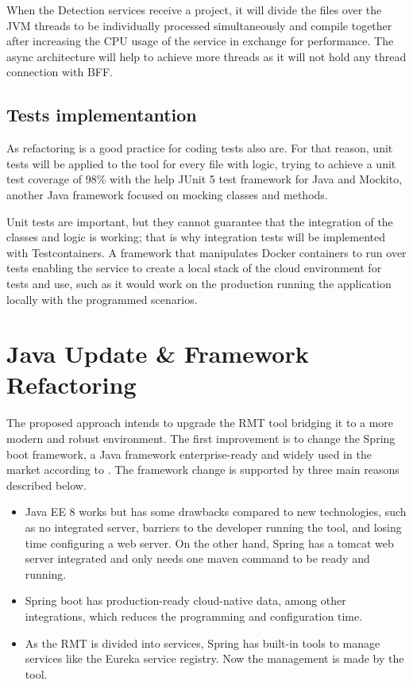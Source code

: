 When the Detection services receive a project, it will divide the files over the JVM threads to be individually processed simultaneously and compile together after increasing the CPU usage of the service in exchange for performance. The async architecture will help to achieve more threads as it will not hold any thread connection with BFF.

\subsection{Tests implementantion}
\label{sub-tests}

As refactoring is a good practice for coding tests also are. For that reason, unit tests will be applied to the tool for every file with logic, trying to achieve a unit test coverage of 98\% with the help JUnit 5 test framework for Java and Mockito, another Java framework focused on mocking classes and methods.

Unit tests are important, but they cannot guarantee that the integration of the classes and logic is working; that is why integration tests will be implemented with Testcontainers. A framework that manipulates Docker containers to run over tests enabling the service to create a local stack of the cloud environment for tests and use, such as it would work on the production running the application locally with the programmed scenarios.



\section{Java Update \& Framework Refactoring}
\label{sec-framework}

The proposed approach intends to upgrade the RMT tool bridging it to a more modern and robust environment. The first improvement is to change the Spring boot framework, a Java framework enterprise-ready and widely used in the market according to \textcite{Mythily2022}. The framework change is supported by three main reasons described below.
\begin{itemize}
\item Java EE 8 works but has some drawbacks compared to new technologies, such as no integrated server, barriers to the developer running the tool, and losing time configuring a web server. On the other hand, Spring has a tomcat web server integrated and only needs one maven command to be ready and running.
\item Spring boot has production-ready cloud-native data, among other integrations, which reduces the programming and configuration time.
\item As the RMT is divided into services, Spring has built-in tools to manage services like the Eureka service registry. Now the management is made by the tool.
\end{itemize}

